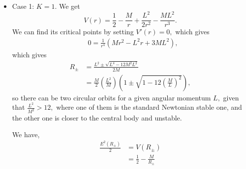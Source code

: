 \documentclass{article}
\numberwithin{equation}{section}
\begin{document}
\begin{itemize}
    \item Case 1: $K = 1.$ We get 
    \begin{equation*}
        V(r) = \frac{1}{2} - \frac{M}{r} + \frac{L^2}{2r^2} - \frac{ML^2}{r^3}.
    \end{equation*}
    We can find its critical points by setting $V'(r)=0,$ which gives 
    \begin{align*}
        & 0 = \frac{1}{r^4}\left(Mr^2 - L^2r + 3ML^2\right),
    \end{align*}
    which gives 
    \begin{align*}
        R_{\pm} &= \frac{L^2 \pm \sqrt{L^4 - 12M^2L^2}}{2M} \\ 
                &= \frac{M}{2}\left(\frac{L^2}{M}\right)\left(1 \pm \sqrt{1-12\left(\frac{M}{L}\right)^2}\right),
    \end{align*}
    so there can be two circular orbits for a given angular momentum $L,$ given that $\frac{L^2}{M^2}>12,$ where one of them is the standard Newtonian stable one, and the other one is closer to the central body and unstable.

    We have,
    \begin{align*}
        \frac{E^2(R_{\pm})}{2} &= V(R_{\pm}) \\ 
        &= \frac{1}{2} - \frac{M}{R_{\pm}}
    \end{align*}
\end{itemize}
\end{document}
